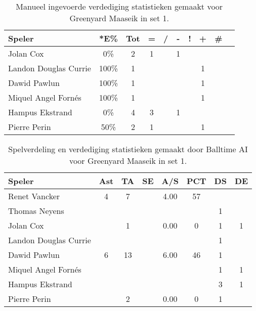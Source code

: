 \begin{table}[ht!]
    \centering
    \scriptsize
    \begin{tabular}{|l|c|c|c|c|c|c|c|c|c|}
        \hline
        \textbf{Speler}  & *E\% & Tot & = & / & - & ! & + & \# \\ \hline
        Jolan Cox & 0\% & 2 & 1 &  & 1 &  &  &  \\ 
        Landon Douglas Currie & 100\% & 1 &  &  &  &  & 1 &  \\ 
        Dawid Pawlun & 100\% & 1 &  &  &  &  & 1 &  \\ 
        Miquel Angel Fornés & 100\% & 1 &  &  &  &  & 1 &  \\ 
        Hampus Ekstrand & 0\% & 4 & 3 &  & 1 &  &  &  \\ 
        Pierre Perin & 50\% & 2 & 1 &  &  &  & 1 &  \\ \hline
    \end{tabular}
    \caption[Manueel ingevoerde verdediging statistieken gemaakt voor Greenyard Maaseik in set 1]{\label{tab:PL1DigMaaseikMan1}Manueel ingevoerde verdediging statistieken gemaakt voor Greenyard Maaseik in set 1.}
\end{table}

\begin{table}[ht!]
  \centering
  \scriptsize
  \begin{tabular}{|l|c|c|c|c|c|c|c|}  \hline
    \textbf{Speler} & Ast & TA & SE & A/S & PCT & DS & DE \\ \hline
    Renet Vancker & 4 & 7 &  & 4.00 & 57 &  &  \\
    Thomas Neyens &  &  &  &  &  & 1 &  \\
    Jolan Cox &  & 1 &  & 0.00 & 0 & 1 & 1 \\
    Landon Douglas Currie &  &  &  &  &  & 1 &  \\
    Dawid Pawlun & 6 & 13 &  & 6.00 & 46 & 1 &  \\
    Miquel Angel Fornés &  &  &  &  &  & 1 & 1 \\
    Hampus Ekstrand &  &  &  &  &  & 3 & 1 \\
    Pierre Perin &  & 2 &  & 0.00 & 0 & 1 &  \\ \hline
  \end{tabular}
  \caption[Spelverdeling en verdediging statistieken gemaakt door Balltime AI voor Greenyard Maaseik in set 1]{\label{tab:PL1SetDigMaaseikAI1}Spelverdeling en verdediging statistieken gemaakt door Balltime AI voor Greenyard Maaseik in set 1.}
\end{table}

